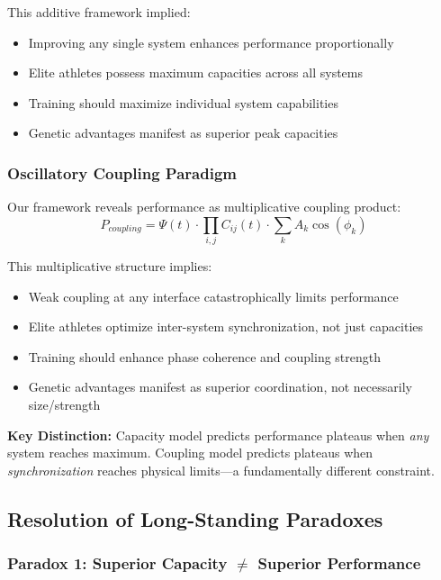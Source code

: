\documentclass[10pt]{article}
\begin{document}
This additive framework implied:
\begin{itemize}
\item Improving any single system enhances performance proportionally
\item Elite athletes possess maximum capacities across all systems
\item Training should maximize individual system capabilities
\item Genetic advantages manifest as superior peak capacities
\end{itemize}

\subsubsection{Oscillatory Coupling Paradigm}

Our framework reveals performance as multiplicative coupling product:
\begin{equation}
P_{coupling} = \Psi(t) \cdot \prod_{i,j} C_{ij}(t) \cdot \sum_k A_k \cos(\phi_k)
\end{equation}

This multiplicative structure implies:
\begin{itemize}
\item Weak coupling at any interface catastrophically limits performance
\item Elite athletes optimize inter-system synchronization, not just capacities
\item Training should enhance phase coherence and coupling strength
\item Genetic advantages manifest as superior coordination, not necessarily size/strength
\end{itemize}

\textbf{Key Distinction:} Capacity model predicts performance plateaus when \emph{any} system reaches maximum. Coupling model predicts plateaus when \emph{synchronization} reaches physical limits—a fundamentally different constraint.

\subsection{Resolution of Long-Standing Paradoxes}

\subsubsection{Paradox 1: Superior Capacity $\neq$ Superior Performance}
\end{document}
